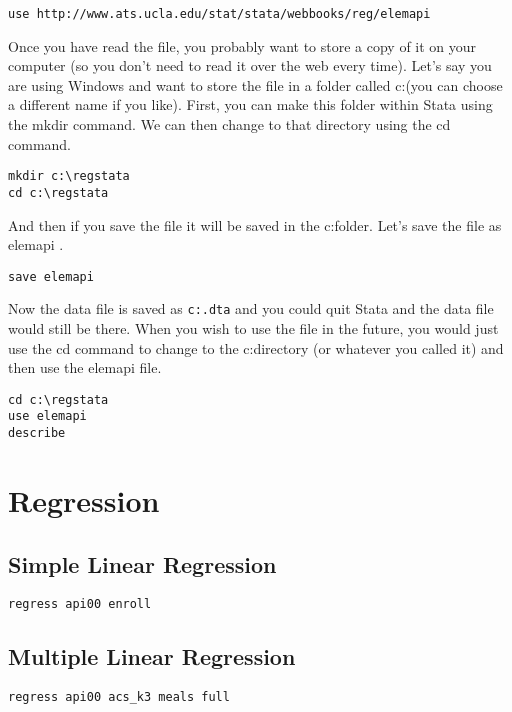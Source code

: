 

\begin{framed}
\begin{verbatim}
use http://www.ats.ucla.edu/stat/stata/webbooks/reg/elemapi
\end{verbatim}
\end{framed}

Once you have read the file, you probably want to store a copy of it on your computer (so you don't need to read it over the web every time).  Let's say you are using Windows and want to store the file in a folder called c:\regstata (you can choose a different name if you like). First, you can make this folder within Stata using the mkdir command. We can then change to that directory using the cd command.

\begin{framed}
\begin{verbatim}
mkdir c:\regstata
cd c:\regstata
\end{verbatim}
\end{framed}

And then if you save the file it will be saved in the c:\regstata folder. Let's save the file as elemapi .

\begin{framed}
\begin{verbatim}
save elemapi
\end{verbatim}
\end{framed}
Now the data file is saved as \texttt{c:\regstata\elemapi.dta} and you could quit Stata and the data file would still be there.  When you wish to use the file in the future, you would just use the cd command to change to the c:\regstata directory (or whatever you called it) and then use the elemapi file.

\begin{framed}
\begin{verbatim}
cd c:\regstata
use elemapi
describe
\end{verbatim}
\end{framed}
\newpage
\section{Regression }
\subsection{Simple Linear Regression}
\begin{framed}
\begin{verbatim}
regress api00 enroll
\end{verbatim}
\end{framed}


\subsection{Multiple Linear Regression}
\begin{framed}
\begin{verbatim}
regress api00 acs_k3 meals full
\end{verbatim}
\end{framed}



